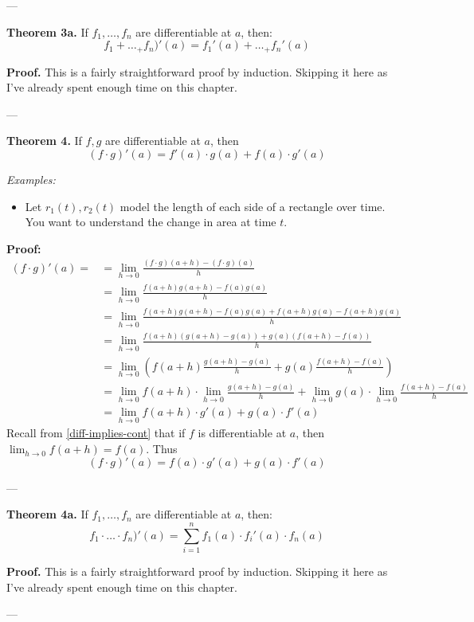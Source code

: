 ---\vs

\textbf{Theorem 3a.} If $f_1,\ldots,f_n$ are differentiable at $a$, then:
\[f_1+\ldots_+f_n)'(a)=f_1'(a)+\ldots_+f_n'(a)\]

\vs

\textbf{Proof.} This is a fairly straightforward proof by induction.
Skipping it here as I've already spent enough time on this chapter.

\vs---\vs

\textbf{Theorem 4.} If $f,g$ are differentiable at $a$, then
\[(f\cdot g)'(a)=f'(a)\cdot g(a)+f(a)\cdot g'(a)\]

\textit{Examples:}
\begin{itemize}
\item Let $r_1(t), r_2(t)$ model the length of each side of a
  rectangle over time. You want to understand the change in area at
  time $t$.
\end{itemize}

\textbf{Proof:}
\begin{align*}
(f\cdot g)'(a)=&=\lim_{h\to0}\frac{(f\cdot g)(a+h)-(f\cdot g)(a)}{h}\\
           &=\lim_{h\to0}\frac{f(a+h)g(a+h)-f(a)g(a)}{h}\\
           &=\lim_{h\to0}\frac{f(a+h)g(a+h)-f(a)g(a) + f(a+h)g(a)-f(a+h)g(a)}{h}\\
           &=\lim_{h\to0}\frac{f(a+h)(g(a+h)-g(a)) + g(a)(f(a+h) - f(a))}{h}\\
           &=\lim_{h\to0}\left(f(a+h)\frac{g(a+h)-g(a)}{h}+g(a)\frac{f(a+h)-f(a)}{h}\right)\\
           &=\lim_{h\to0}f(a+h)\cdot\lim_{h\to0}\frac{g(a+h)-g(a)}{h}+\lim_{h\to0}g(a)\cdot\lim_{h\to0}\frac{f(a+h)-f(a)}{h}\\
           &=\lim_{h\to0}f(a+h)\cdot g'(a)+g(a)\cdot f'(a)
\end{align*}
Recall from \ref{diff-implies-cont} that if $f$ is differentiable at
$a$, then $\lim_{h\to0}f(a+h)=f(a)$. Thus
\[(f\cdot g)'(a)=f(a)\cdot g'(a)+g(a)\cdot f'(a)\]

---\vs

\textbf{Theorem 4a.} If $f_1,\ldots,f_n$ are differentiable at $a$, then:
\[f_1\cdot\ldots\cdot f_n)'(a)=\sum_{i=1}^n f_1(a)\cdot f_i'(a)\cdot f_n(a)\]

\vs

\textbf{Proof.} This is a fairly straightforward proof by induction.
Skipping it here as I've already spent enough time on this chapter.

\vs---\vs

